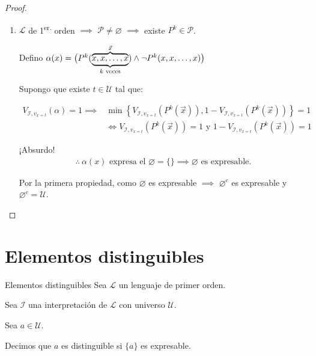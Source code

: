 \begin{proof}
\begin{enumerate}
        \item $\mathcal{L}$ de 1\textsuperscript{er.} orden $\implies$
            $\mathcal{P} \neq \varnothing$ $\implies$ existe 
            $P^k \in \mathcal{P}$.

            Defino $\alpha(x) = \big(
                P^k ( \overbrace{%
                \underbrace{x,x,\dotsc,x}_{k\text{ veces}}}^{\vec{x}} )
                \wedge 
                \neg P^k (x, x, \dotsc,x) \big)$

            Supongo que existe $t \in \mathcal{U}$ tal que:

            \begin{align*}
                V_{\mathcal{I}, v_{x=t}}(\alpha)=1 \implies&
                \min{\left\{ V_{\mathcal{I}, v_{x=t}} \left(P^k(\vec{x})\right), 
                1 - V_{\mathcal{I}, v_{x=t}}\left(P^k(\vec{x})\right)
                \right\}} = 1 \\
                &\iff V_{\mathcal{I}, v_{x=t}} \left(P^k(\vec{x})\right)=1 
                \text{ y }
                1 - V_{\mathcal{I}, v_{x=t}}\left(P^k(\vec{x})\right) = 1
            \end{align*}

            ¡Absurdo!
            \begin{gather*}
                \therefore ~ \alpha(x) \text{ expresa el } \varnothing = \{\}
                \implies \varnothing \text{ es expresable.}
            \end{gather*}

            Por la primera propiedad, como $\varnothing$ es expresable
            $\implies$ $\varnothing^c$ es expresable y 
            $\varnothing^c=\mathcal{U}$.
    \end{enumerate}
\end{proof}

\section{Elementos distinguibles}
\begin{definicion}{Elementos distinguibles}{}
    Sea $\mathcal{L}$ un lenguaje de primer orden.

    Sea $\mathcal{I}$ una interpretación de $\mathcal{L}$ con universo 
    $\mathcal{U}$.

    Sea $a \in \mathcal{U}$.

    \medskip

    Decimos que $a$ es distinguible si $\{ a \}$ es expresable.
\end{definicion}



